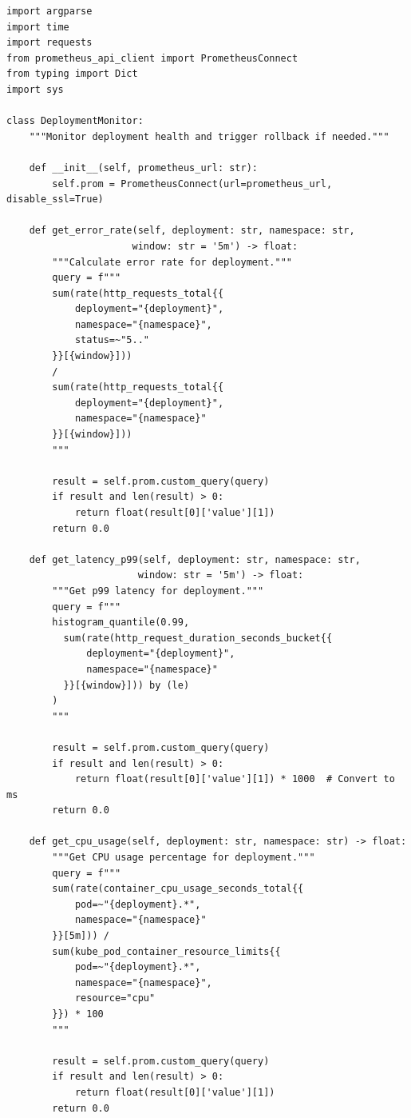 \begin{lstlisting}[style=python, caption=scripts/monitor_deployment.py]
import argparse
import time
import requests
from prometheus_api_client import PrometheusConnect
from typing import Dict
import sys

class DeploymentMonitor:
    """Monitor deployment health and trigger rollback if needed."""

    def __init__(self, prometheus_url: str):
        self.prom = PrometheusConnect(url=prometheus_url, disable_ssl=True)

    def get_error_rate(self, deployment: str, namespace: str,
                      window: str = '5m') -> float:
        """Calculate error rate for deployment."""
        query = f"""
        sum(rate(http_requests_total{{
            deployment="{deployment}",
            namespace="{namespace}",
            status=~"5.."
        }}[{window}]))
        /
        sum(rate(http_requests_total{{
            deployment="{deployment}",
            namespace="{namespace}"
        }}[{window}]))
        """

        result = self.prom.custom_query(query)
        if result and len(result) > 0:
            return float(result[0]['value'][1])
        return 0.0

    def get_latency_p99(self, deployment: str, namespace: str,
                       window: str = '5m') -> float:
        """Get p99 latency for deployment."""
        query = f"""
        histogram_quantile(0.99,
          sum(rate(http_request_duration_seconds_bucket{{
              deployment="{deployment}",
              namespace="{namespace}"
          }}[{window}])) by (le)
        )
        """

        result = self.prom.custom_query(query)
        if result and len(result) > 0:
            return float(result[0]['value'][1]) * 1000  # Convert to ms
        return 0.0

    def get_cpu_usage(self, deployment: str, namespace: str) -> float:
        """Get CPU usage percentage for deployment."""
        query = f"""
        sum(rate(container_cpu_usage_seconds_total{{
            pod=~"{deployment}.*",
            namespace="{namespace}"
        }}[5m])) /
        sum(kube_pod_container_resource_limits{{
            pod=~"{deployment}.*",
            namespace="{namespace}",
            resource="cpu"
        }}) * 100
        """

        result = self.prom.custom_query(query)
        if result and len(result) > 0:
            return float(result[0]['value'][1])
        return 0.0


\end{lstlisting}
